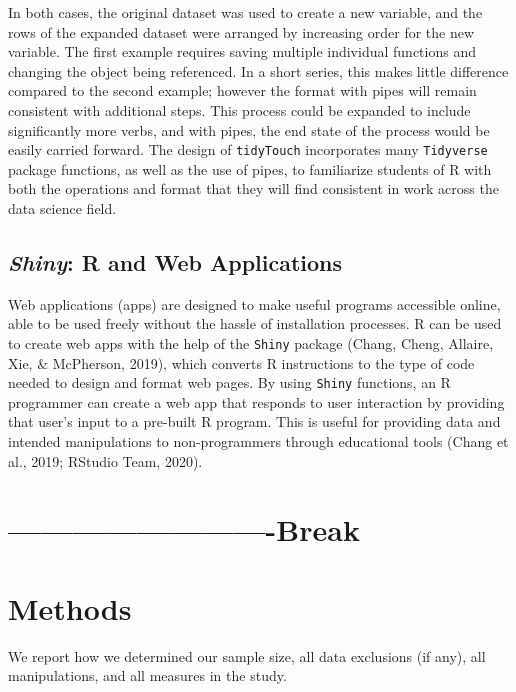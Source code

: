 \documentclass[english,man,floatsintext]{apa6}
\begin{document}
In both cases, the original dataset was used to create a new variable, and the rows of the expanded dataset were arranged by increasing order for the new variable. The first example requires saving multiple individual functions and changing the object being referenced. In a short series, this makes little difference compared to the second example; however the format with pipes will remain consistent with additional steps. This process could be expanded to include significantly more verbs, and with pipes, the end state of the process would be easily carried forward. The design of \texttt{tidyTouch} incorporates many \texttt{Tidyverse} package functions, as well as the use of pipes, to familiarize students of R with both the operations and format that they will find consistent in work across the data science field.

\hypertarget{shiny-r-and-web-applications}{%
\subsection{\texorpdfstring{\emph{Shiny}: R and Web Applications}{Shiny: R and Web Applications}}\label{shiny-r-and-web-applications}}

Web applications (apps) are designed to make useful programs accessible online, able to be used freely without the hassle of installation processes. R can be used to create web apps with the help of the \texttt{Shiny} package (Chang, Cheng, Allaire, Xie, \& McPherson, 2019), which converts R instructions to the type of code needed to design and format web pages. By using \texttt{Shiny} functions, an R programmer can create a web app that responds to user interaction by providing that user's input to a pre-built R program. This is useful for providing data and intended manipulations to non-programmers through educational tools (Chang et al., 2019; RStudio Team, 2020).

\hypertarget{break}{%
\section{-------------------------Break}\label{break}}

\hypertarget{methods}{%
\section{Methods}\label{methods}}

We report how we determined our sample size, all data exclusions (if any), all manipulations, and all measures in the study.
\end{document}
